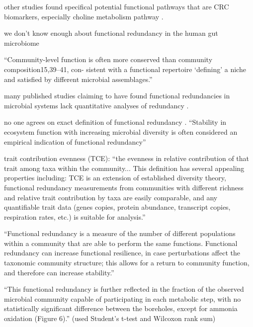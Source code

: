 \documentclass[11pt]{article}
\begin{document}
other studies found specifical potential functional pathways that are CRC biomarkers, especially choline metabolism pathway \cite{thomas_metagenomic_2019}.


we don't know enough about functional redundancy in the human gut microbiome \cite{heintz-buschart_human_2018}

``Community-level function is often more conserved than community composition15,39–41, con- sistent with a functional repertoire ‘defining’ a niche and satisfied by different microbial assemblages.'' \cite{franzosa_species-level_2018}

many published studies claiming to have found functional redundancies in microbial systems lack quantitative analyses of redundancy \cite{souza_metagenomic_2015, ferrer_microbiota_2013}.

no one agrees on exact definition of functional redundancy \cite{louca_function_2018, heintz-buschart_human_2018, tully_dynamic_2018, royalty_quantitative_2020}.
``Stability in ecosystem function with increasing microbial diversity is often considered an empirical indication of functional redundancy''
\cite{royalty_quantitative_2020}


trait contribution evenness (TCE): ``the evenness in relative contribution of that trait among taxa within the community... This definition has several appealing properties including: TCE is an extension of established diversity theory, functional redundancy measurements from communities with different richness and relative trait contribution by taxa are easily comparable, and any quantifiable trait data (genes copies, protein abundance, transcript copies, respiration rates, etc.) is suitable for analysis.'' \cite{royalty_quantitative_2020}

``Functional redundancy is a measure of the number of different populations within a community that are able to perform the same functions. Functional redundancy can increase functional resilience, in case perturbations affect the taxonomic community structure; this allows for a return to community function, and therefore can increase stability.'' \cite{heintz-buschart_human_2018}

``This functional redundancy is further reflected in the fraction of the observed microbial community capable of participating in each metabolic step, with no statistically significant difference between the boreholes, except for ammonia oxidation (Figure 6).'' (used Student's t-test and Wilcoxon rank sum) \cite{tully_dynamic_2018}
\end{document}
